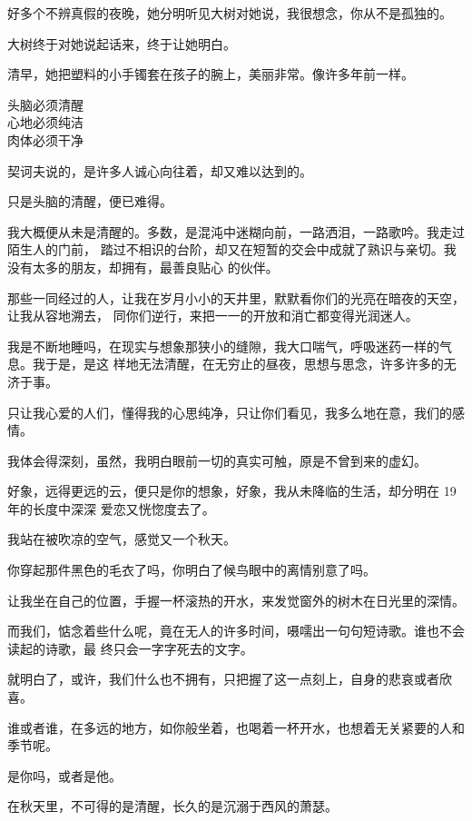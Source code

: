 		好多个不辨真假的夜晚，她分明听见大树对她说，我很想念，你从不是孤独的。

		大树终于对她说起话来，终于让她明白。


		清早，她把塑料的小手镯套在孩子的腕上，美丽非常。像许多年前一样。

	\endwriting



		\longpoem{}{}{}
			头脑必须清醒 \\
			心地必须纯洁 \\
			肉体必须干净
		\endlongpoem

		契诃夫说的，是许多人诚心向往着，却又难以达到的。\par
		只是头脑的清醒，便已难得。

		我大概便从未是清醒的。多数，是混沌中迷糊向前，一路洒泪，一路歌吟。我走过陌生人的门前，
	踏过不相识的台阶，却又在短暂的交会中成就了熟识与亲切。我没有太多的朋友，却拥有，最善良贴心
	的伙伴。

		那些一同经过的人，让我在岁月小小的天井里，默默看你们的光亮在暗夜的天空，让我从容地溯去，
	同你们逆行，来把一一的开放和消亡都变得光润迷人。

		我是不断地睡吗，在现实与想象那狭小的缝隙，我大口喘气，呼吸迷药一样的气息。我于是，是这
	样地无法清醒，在无穷止的昼夜，思想与思念，许多许多的无济于事。

		只让我心爱的人们，懂得我的心思纯净，只让你们看见，我多么地在意，我们的感情。

		我体会得深刻，虽然，我明白眼前一切的真实可触，原是不曾到来的虚幻。

		好象，远得更远的云，便只是你的想象，好象，我从未降临的生活，却分明在 19 年的长度中深深
	爱恋又恍惚度去了。

		我站在被吹凉的空气，感觉又一个秋天。\par
		你穿起那件黑色的毛衣了吗，你明白了候鸟眼中的离情别意了吗。

		让我坐在自己的位置，手握一杯滚热的开水，来发觉窗外的树木在日光里的深情。\par
		而我们，惦念着些什么呢，竟在无人的许多时间，嗫嚅出一句句短诗歌。谁也不会读起的诗歌，最
	终只会一字字死去的文字。\par
		就明白了，或许，我们什么也不拥有，只把握了这一点刻上，自身的悲哀或者欣喜。\par
		谁或者谁，在多远的地方，如你般坐着，也喝着一杯开水，也想着无关紧要的人和季节呢。\par
		是你吗，或者是他。\par
		在秋天里，不可得的是清醒，长久的是沉溺于西风的萧瑟。

